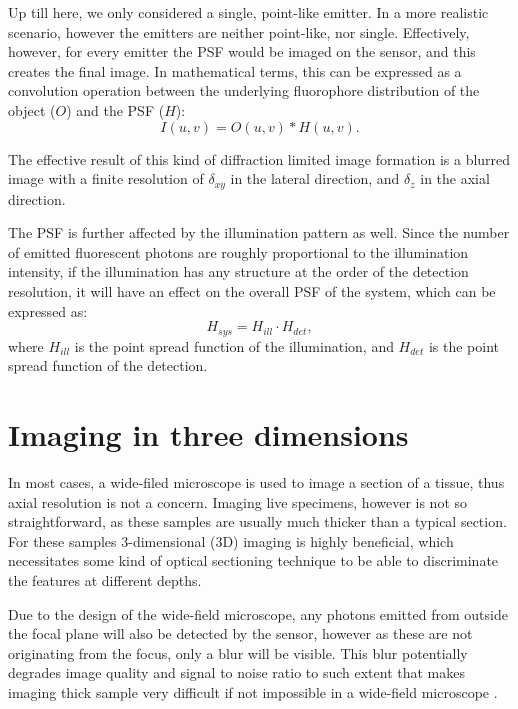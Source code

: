     Up till here, we only considered a single, point-like emitter. In a more realistic scenario, however the emitters are neither point-like, nor single. Effectively, however, for every emitter the PSF would be imaged on the sensor, and this creates the final image. In mathematical terms, this can be expressed as a convolution operation between the underlying fluorophore distribution of the object ($O$) and the PSF ($H$):
    \begin{equation}
      I(u,v) = O(u,v) * H(u,v).
    \end{equation}

    The effective result of this kind of diffraction limited image formation is a blurred image with a finite resolution of $\delta_{xy}$ in the lateral direction, and $\delta_z$ in the axial direction.

    The PSF is further affected by the illumination pattern as well. Since the number of emitted fluorescent photons are roughly proportional to the illumination intensity, if the illumination has any structure at the order of the detection resolution, it will have an effect on the overall PSF of the system, which can be expressed as:
    \begin{equation}
      H_{sys} = H_{ill} \cdot H_{det},
      \label{eq:systemPSF}
    \end{equation}
    where $H_{ill}$ is the point spread function of the illumination, and $H_{det}$ is the point spread function of the detection.


\section{Imaging in three dimensions}
  In most cases, a wide-filed microscope is used to image a section of a tissue, thus axial resolution is not a concern. Imaging live specimens, however is not so straightforward, as these samples are usually much thicker than a typical section. For these samples 3-dimensional (3D) imaging is highly beneficial, which necessitates some kind of optical sectioning technique to be able to discriminate the features at different depths.


  Due to the design of the wide-field microscope, any photons emitted from outside the focal plane will also be detected by the sensor, however as these are not originating from the focus, only a blur will be visible. This blur potentially degrades image quality and signal to noise ratio to such extent that makes imaging thick sample very difficult if not impossible in a wide-field microscope \cite{!!!}. 

